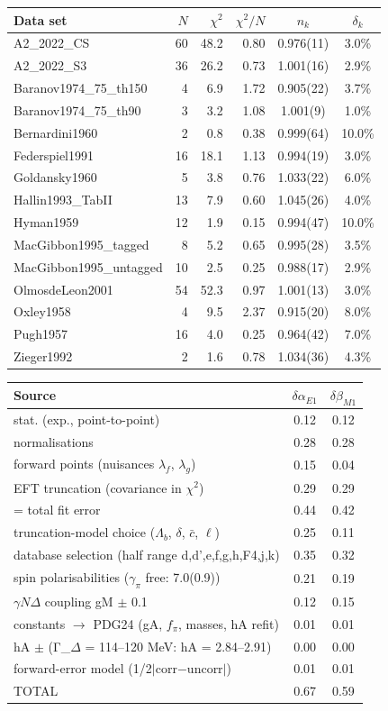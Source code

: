 \begin{tabular}{lrrrcc}
\hline
Data set & $N$ & $\chi^2$ & $\chi^2/N$ & $n_k$ & $\delta_k$ \\
\hline
A2\_2022\_CS & 60 & 48.2 & 0.80 & 0.976(11) & 3.0\% \\
A2\_2022\_S3 & 36 & 26.2 & 0.73 & 1.001(16) & 2.9\% \\
Baranov1974\_75\_th150 & 4 & 6.9 & 1.72 & 0.905(22) & 3.7\% \\
Baranov1974\_75\_th90 & 3 & 3.2 & 1.08 & 1.001(9) & 1.0\% \\
Bernardini1960 & 2 & 0.8 & 0.38 & 0.999(64) & 10.0\% \\
Federspiel1991 & 16 & 18.1 & 1.13 & 0.994(19) & 3.0\% \\
Goldansky1960 & 5 & 3.8 & 0.76 & 1.033(22) & 6.0\% \\
Hallin1993\_TabII & 13 & 7.9 & 0.60 & 1.045(26) & 4.0\% \\
Hyman1959 & 12 & 1.9 & 0.15 & 0.994(47) & 10.0\% \\
MacGibbon1995\_tagged & 8 & 5.2 & 0.65 & 0.995(28) & 3.5\% \\
MacGibbon1995\_untagged & 10 & 2.5 & 0.25 & 0.988(17) & 2.9\% \\
OlmosdeLeon2001 & 54 & 52.3 & 0.97 & 1.001(13) & 3.0\% \\
Oxley1958 & 4 & 9.5 & 2.37 & 0.915(20) & 8.0\% \\
Pugh1957 & 16 & 4.0 & 0.25 & 0.964(42) & 7.0\% \\
Zieger1992 & 2 & 1.6 & 0.78 & 1.034(36) & 4.3\% \\
\hline
\end{tabular}

\begin{tabular}{lcc}
\hline
Source & $\delta\alpha_{E1}$ & $\delta\beta_{M1}$ \\
\hline
stat. (exp., point-to-point) & 0.12 & 0.12 \\
normalisations & 0.28 & 0.28 \\
forward points (nuisances $\lambda_f$, $\lambda_g$) & 0.15 & 0.04 \\
EFT truncation (covariance in $\chi^2$) & 0.29 & 0.29 \\
= total fit error & 0.44 & 0.42 \\
truncation-model choice ($\Lambda_b$, $\delta$, $\bar c$, $\ell$) & 0.25 & 0.11 \\
database selection (half range d,d',e,f,g,h,F4,j,k) & 0.35 & 0.32 \\
spin polarisabilities ($\gamma_\pi$ free: 7.0(0.9)) & 0.21 & 0.19 \\
$\gamma N\Delta$ coupling gM $\pm$ 0.1 & 0.12 & 0.15 \\
constants $\to$ PDG24 (gA, $f_\pi$, masses, hA refit) & 0.01 & 0.01 \\
hA $\pm$ (Γ\_$\Delta$ = 114–120 MeV: hA = 2.84–2.91) & 0.00 & 0.00 \\
forward-error model (1/2$|$corr$-$uncorr$|$) & 0.01 & 0.01 \\
TOTAL & 0.67 & 0.59 \\
\hline
\end{tabular}

